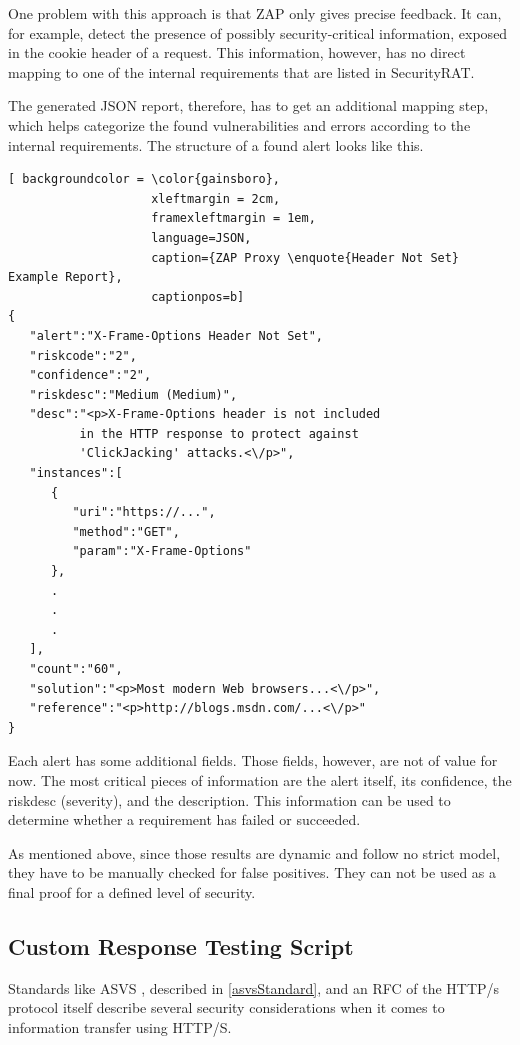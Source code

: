 One problem with this approach is that ZAP only gives precise feedback. It can, for example, detect the presence of possibly security-critical information, exposed in the cookie header of a request. This information, however, has no direct mapping to one of the internal requirements that are listed in SecurityRAT.

The generated JSON report, therefore, has to get an additional mapping step, which helps categorize the found vulnerabilities and errors according to the internal requirements.
The structure of a found alert looks like this.

\vskip 1cm

\begin{lstlisting}[ backgroundcolor = \color{gainsboro}, 
                    xleftmargin = 2cm, 
                    framexleftmargin = 1em, 
                    language=JSON,
                    caption={ZAP Proxy \enquote{Header Not Set} Example Report},
                    captionpos=b]
{
   "alert":"X-Frame-Options Header Not Set",
   "riskcode":"2",
   "confidence":"2",
   "riskdesc":"Medium (Medium)",
   "desc":"<p>X-Frame-Options header is not included
          in the HTTP response to protect against
          'ClickJacking' attacks.<\/p>",
   "instances":[
      {
         "uri":"https://...",
         "method":"GET",
         "param":"X-Frame-Options"
      },
      .
      .
      .
   ],
   "count":"60",
   "solution":"<p>Most modern Web browsers...<\/p>",
   "reference":"<p>http://blogs.msdn.com/...<\/p>"
}
\end{lstlisting}

Each alert has some additional fields. Those fields, however, are not of value for now. The most critical pieces of information are the alert itself, its confidence, the riskdesc (severity), and the description. This information can be used to determine whether a requirement has failed or succeeded.

As mentioned above, since those results are dynamic and follow no strict model, they have to be manually checked for false positives. They can not be used as a final proof for a defined level of security.


\subsection{Custom Response Testing Script}
\label{customTestingScript} 
Standards like ASVS \citep{asvs4.0}, described in \ref{asvsStandard}, and an RFC of the HTTP/s protocol \citep{httpRFC} itself describe several security considerations when it comes to information transfer using HTTP/S.

